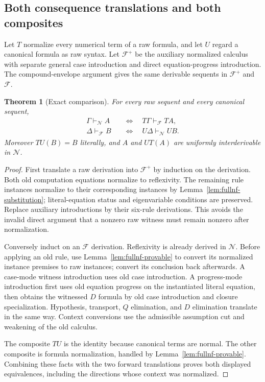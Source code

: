 \documentclass[11pt,letterpaper]{article}
\newtheorem{theorem}{Theorem}[section]
\theoremstyle{definition}
\theoremstyle{remark}
\begin{document}
\subsection{Both consequence translations and both composites}

Let $T$ normalize every numerical term of a raw formula, and let $U$ regard
a canonical formula as raw syntax.  Let $\mathcal F^+$ be the auxiliary
normalized calculus with separate general case introduction and direct
equation-progress introduction.  The compound-envelope argument gives
the same derivable sequents in $\mathcal F^+$ and $\mathcal F$.

\begin{theorem}[Exact comparison]
\label{thm:fullnf-comparison}
For every raw sequent and every canonical sequent,
\begin{align*}
 \Gamma\vdash_{\mathcal N}A
   &\quad\Longleftrightarrow\quad
       T\Gamma\vdash_{\mathcal F}TA,\\
 \Delta\vdash_{\mathcal F}B
   &\quad\Longleftrightarrow\quad
       U\Delta\vdash_{\mathcal N}UB.
\end{align*}
Moreover $TU(B)=B$ literally, and $A$ and $UT(A)$ are uniformly
interderivable in $\mathcal N$.
\end{theorem}
\begin{proof}
First translate a raw derivation into $\mathcal F^+$ by induction on the
derivation.  Both old computation equations normalize to reflexivity.
The remaining rule instances normalize to their corresponding instances
by Lemma~\ref{lem:fullnf-substitution}; literal-equation status and
eigenvariable conditions are preserved.  Replace auxiliary introductions
by their six-rule derivations.  This avoids the invalid direct argument
that a nonzero raw witness must remain nonzero after normalization.

Conversely induct on an $\mathcal F$ derivation.  Reflexivity is already
derived in $\mathcal N$.  Before applying an old rule, use
Lemma~\ref{lem:fullnf-provable} to convert its normalized instance premises
to raw instances; convert its conclusion back afterwards.  A case-mode
witness introduction uses old case introduction.  A progress-mode
introduction first uses old equation progress on the instantiated literal
equation, then obtains the witnessed $D$ formula by old case introduction
and closure specialization.  Hypothesis, transport, $Q$ elimination, and
$D$ elimination translate in the same way.  Context conversions use the
admissible assumption cut and weakening of the old calculus.

The composite $TU$ is the identity because canonical terms are normal.
The other composite is formula normalization, handled by
Lemma~\ref{lem:fullnf-provable}.  Combining these facts with the two forward
translations proves both displayed equivalences, including the directions
whose context was normalized.
\end{proof}
\end{document}
